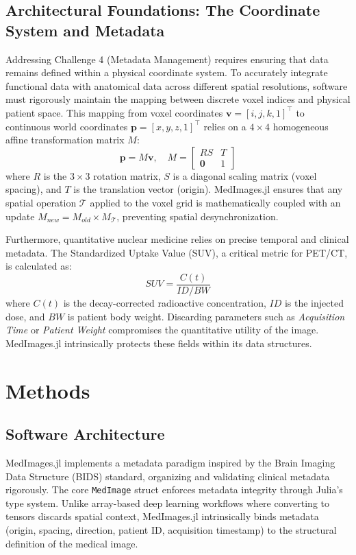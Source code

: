 \documentclass[10pt,letterpaper]{article}
\begin{document}
\subsection{Architectural Foundations: The Coordinate System and Metadata}
Addressing Challenge 4 (Metadata Management) requires ensuring that data remains defined within a physical coordinate system. To accurately integrate functional data with anatomical data across different spatial resolutions, software must rigorously maintain the mapping between discrete voxel indices and physical patient space. This mapping from voxel coordinates $\mathbf{v} = [i, j, k, 1]^\top$ to continuous world coordinates $\mathbf{p} = [x, y, z, 1]^\top$ relies on a $4 \times 4$ homogeneous affine transformation matrix $M$:
\begin{equation}
\mathbf{p} = M \mathbf{v}, \quad M = 
\begin{bmatrix} 
R S & T \\
\mathbf{0} & 1
\end{bmatrix}
\end{equation}
where $R$ is the $3 \times 3$ rotation matrix, $S$ is a diagonal scaling matrix (voxel spacing), and $T$ is the translation vector (origin). MedImages.jl ensures that any spatial operation $\mathcal{T}$ applied to the voxel grid is mathematically coupled with an update $M_{new} = M_{old} \times M_{\mathcal{T}}$, preventing spatial desynchronization.

Furthermore, quantitative nuclear medicine relies on precise temporal and clinical metadata. The Standardized Uptake Value (SUV), a critical metric for PET/CT, is calculated as:
\begin{equation}
SUV = \frac{C(t)}{ID / BW}
\end{equation}
where $C(t)$ is the decay-corrected radioactive concentration, $ID$ is the injected dose, and $BW$ is patient body weight. Discarding parameters such as \textit{Acquisition Time} or \textit{Patient Weight} compromises the quantitative utility of the image. MedImages.jl intrinsically protects these fields within its data structures.

\section{Methods}

\subsection*{Software Architecture}
MedImages.jl implements a metadata paradigm inspired by the Brain Imaging Data Structure (BIDS) standard, organizing and validating clinical metadata rigorously. The core \texttt{MedImage} struct enforces metadata integrity through Julia's type system. Unlike array-based deep learning workflows where converting to tensors discards spatial context, MedImages.jl intrinsically binds metadata (origin, spacing, direction, patient ID, acquisition timestamp) to the structural definition of the medical image.
\end{document}
